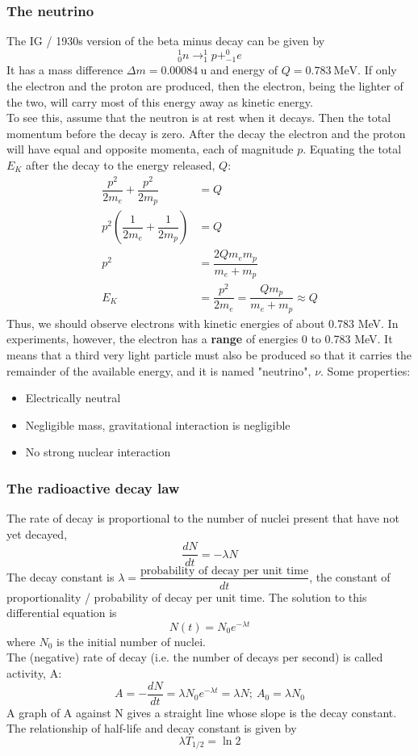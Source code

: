 \documentclass[a4paper,12pt]{article}
\begin{document}
\subsubsection*{The neutrino}
The IG / 1930s version of the beta minus decay can be given by
\[^1_0n\rightarrow ^1_1p+^0_{-1}e\]
It has a mass difference $\Delta m=0.00084\ \text{u}$ and energy of $Q=0.783\ \text{MeV}$.
If only the electron and the proton are produced, then the electron, being the lighter of the two, will carry most of this energy away as kinetic energy. \\
To see this, assume that the neutron is at rest when it decays. Then the total momentum before the decay is zero. After the decay the electron and the proton will have equal and opposite momenta, each of magnitude $p$. Equating the total $E_K$ after the decay to the energy released, $Q$:
\[
\begin{aligned}
  \dfrac{p^2}{2m_e}+\dfrac{p^2}{2m_p}&=Q\\
  p^2\left(\dfrac{1}{2m_e}+\dfrac{1}{2m_p}\right)&=Q\\
  p^2&=\dfrac{2Qm_em_p}{m_e+m_p}\\
  E_K&=\dfrac{p^2}{2m_e}=\dfrac{Qm_p}{m_e+m_p}\approx Q
\end{aligned}\]
Thus, we should observe electrons with kinetic energies of about 0.783 MeV. In experiments, however, the electron has a \textbf{range} of energies 0 to 0.783 MeV.
It means that a third very light particle must also be produced so that it carries the remainder of the available energy, and it is named "neutrino", $\nu$. Some properties:
\begin{itemize}
  \item Electrically neutral
  \item Negligible mass, gravitational interaction is negligible
  \item No strong nuclear interaction
\end{itemize}
\subsubsection*{The radioactive decay law}
The rate of decay is proportional to the number of nuclei present that have not yet decayed,
\[\dfrac{dN}{dt}=-\lambda N\]
The decay constant is $\lambda=\dfrac{\text{probability of decay per unit time}}{dt}$, the constant of proportionality / probability of decay per unit time. The solution to this differential equation is
\[N(t)=N_0e^{-\lambda t}\]
where $N_0$ is the initial number of nuclei.\\
The (negative) rate of decay (i.e. the number of decays per second) is called activity, A:
\[A=-\dfrac{dN}{dt}=\lambda N_0e^{-\lambda t}=\lambda N;\ A_0=\lambda N_0\]
A graph of A against N gives a straight line whose slope is the decay constant.\\
The relationship of half-life and decay constant is given by
\[\lambda T_{1/2}=\ln 2\]
\end{document}
